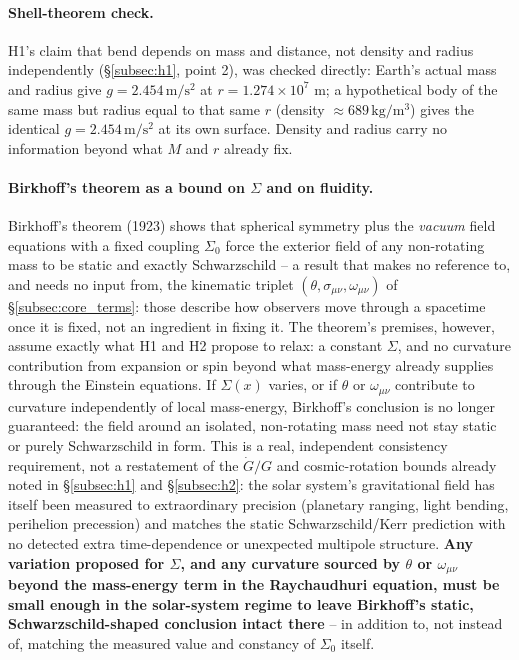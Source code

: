 \documentclass[12pt, a4paper]{article}
\begin{document}
\paragraph{Shell-theorem check.} H1's claim that bend depends on mass
and distance, not density and radius independently
(\S\ref{subsec:h1}, point 2), was checked directly: Earth's actual
mass and radius give $g=2.454\,\mathrm{m/s^2}$ at $r=1.274\times10^7$
m; a hypothetical body of the same mass but radius equal to that same
$r$ (density $\approx689\,\mathrm{kg/m^3}$) gives the identical
$g=2.454\,\mathrm{m/s^2}$ at its own surface. Density and radius carry
no information beyond what $M$ and $r$ already fix.

\paragraph{Birkhoff's theorem as a bound on $\Sigma$ and on fluidity.}
Birkhoff's theorem (1923) shows that spherical symmetry plus the
\emph{vacuum} field equations with a fixed coupling $\Sigma_0$ force
the exterior field of any non-rotating mass to be static and exactly
Schwarzschild -- a result that makes no reference to, and needs no
input from, the kinematic triplet $(\theta,\sigma_{\mu\nu},
\omega_{\mu\nu})$ of \S\ref{subsec:core_terms}: those describe how
observers move through a spacetime once it is fixed, not an ingredient
in fixing it. The theorem's premises, however, assume exactly what
H1 and H2 propose to relax: a constant $\Sigma$, and no curvature
contribution from expansion or spin beyond what mass-energy already
supplies through the Einstein equations. If $\Sigma(x)$ varies, or if
$\theta$ or $\omega_{\mu\nu}$ contribute to curvature independently
of local mass-energy, Birkhoff's conclusion is no longer guaranteed:
the field around an isolated, non-rotating mass need not stay static
or purely Schwarzschild in form. This is a real, independent
consistency requirement, not a restatement of the $\dot G/G$ and
cosmic-rotation bounds already noted in \S\ref{subsec:h1} and
\S\ref{subsec:h2}: the solar system's gravitational field has itself
been measured to extraordinary precision (planetary ranging, light
bending, perihelion precession) and matches the static
Schwarzschild/Kerr prediction with no detected extra time-dependence
or unexpected multipole structure. \textbf{Any variation proposed for
$\Sigma$, and any curvature sourced by $\theta$ or $\omega_{\mu\nu}$
beyond the mass-energy term in the Raychaudhuri equation, must be
small enough in the solar-system regime to leave Birkhoff's
static, Schwarzschild-shaped conclusion intact there} -- in addition
to, not instead of, matching the measured value and constancy of
$\Sigma_0$ itself.
\end{document}
